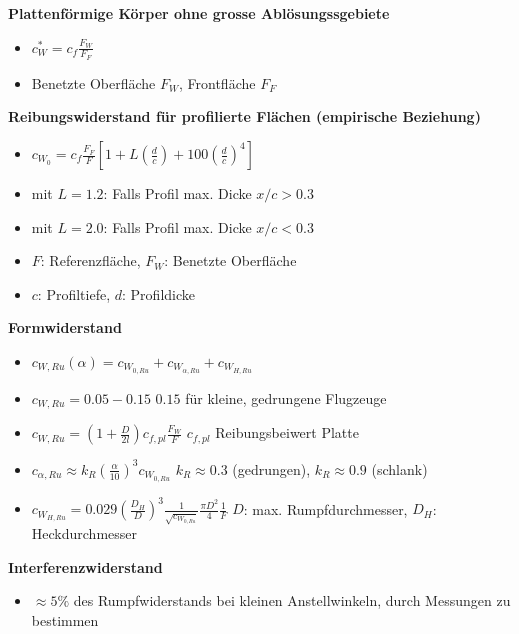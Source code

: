 \documentclass[8pt, landscape, fleqn]{scrartcl}
\begin{document}
\begin{multicols*}{3}
\textbf{Plattenförmige Körper ohne grosse Ablösungssgebiete}

\begin{itemize}
    \item $c_W^* = c_f \frac{F_W}{F_F}$
    \item Benetzte Oberfläche $F_W$, Frontfläche $F_F$
\end{itemize}

\textbf{Reibungswiderstand für profilierte Flächen (empirische Beziehung)}

\begin{itemize}
    \item $c_{W_0} = c_f \frac{F_F}{F}\left[1 + L\left(\frac{d}{c}\right)+100\left(\frac{d}{c}\right)^4\right]$
    \item mit $L = 1.2$: Falls Profil max. Dicke $x/c > 0.3$
    \item mit $L = 2.0$: Falls Profil max. Dicke $x/c < 0.3$
    \item $F$: Referenzfläche, $F_W$: Benetzte Oberfläche
    \item $c$: Profiltiefe, $d$: Profildicke
\end{itemize}

\textbf{Formwiderstand}

\begin{itemize}
    \item $c_{W,Ru}(\alpha) = c_{W_{0,Ru}}+c_{W_{\alpha,Ru}}+c_{W_{H,Ru}}$
    \item $c_{W,Ru} = 0.05-0.15$ \newline $0.15$ für kleine, gedrungene Flugzeuge
    \item $c_{W,Ru} = \left( 1 + \frac{D}{2l}\right)c_{f,pl}\frac{F_W}{F}$ \newline $c_{f,pl}$ Reibungsbeiwert Platte
    \item $c_{\alpha,Ru} \approx k_R \left(\frac{\alpha}{10}\right)^3 c_{W_{0,Ru}}$ \newline $k_R \approx 0.3$ (gedrungen), $k_R \approx 0.9$ (schlank)
    \item $c_{W_{H,Ru}} = 0.029 \left(\frac{D_H}{D}\right)^3 \frac{1}{\sqrt{c_{W_{0,Ru}}}}\frac{\pi D^2}{4}\frac{1}{F}$ \newline $D$: max. Rumpfdurchmesser, $D_H$: Heckdurchmesser
\end{itemize}

\textbf{Interferenzwiderstand}

\begin{itemize}
    \item $\approx 5\%$ des Rumpfwiderstands bei kleinen Anstellwinkeln, durch Messungen zu bestimmen
\end{itemize}


\end{multicols*}
\end{document}

